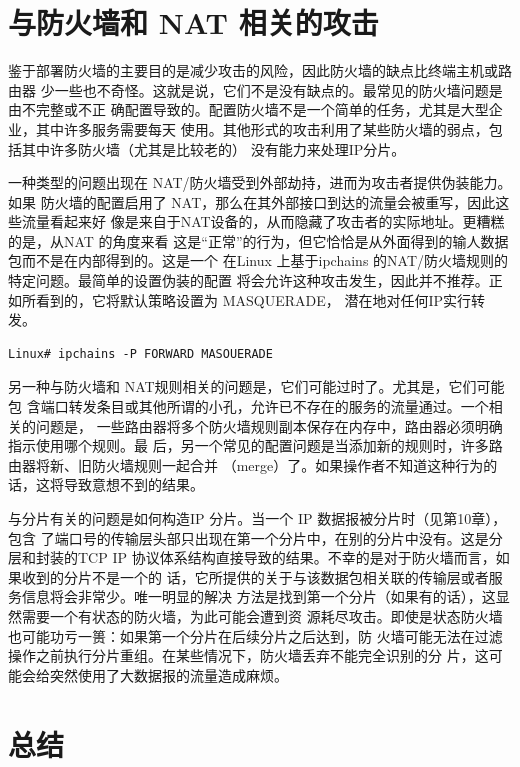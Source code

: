 \section{与防火墙和 NAT 相关的攻击}

鉴于部署防火墙的主要目的是减少攻击的风险，因此防火墙的缺点比终端主机或路由器
少一些也不奇怪。这就是说，它们不是没有缺点的。最常见的防火墙问题是由不完整或不正
确配置导致的。配置防火墙不是一个简单的任务，尤其是大型企业，其中许多服务需要每天
使用。其他形式的攻击利用了某些防火墙的弱点，包括其中许多防火墙（尤其是比较老的）
没有能力来处理IP分片。

一种类型的问题出现在 NAT/防火墙受到外部劫持，进而为攻击者提供伪装能力。如果
防火墙的配置启用了 NAT，那么在其外部接口到达的流量会被重写，因此这些流量看起来好
像是来自于NAT设备的，从而隐藏了攻击者的实际地址。更糟糕的是，从NAT 的角度来看
这是“正常”的行为，但它恰恰是从外面得到的输人数据包而不是在内部得到的。这是一个
在Linux 上基于ipchains 的NAT/防火墙规则的特定问题。最简单的设置伪装的配置
将会允许这种攻击发生，因此并不推荐。正如所看到的，它将默认策略设置为 MASQUERADE，
潜在地对任何IP实行转发。

\begin{verbatim}    
Linux# ipchains -P FORWARD MASOUERADE
\end{verbatim}


另一种与防火墙和 NAT规则相关的问题是，它们可能过时了。尤其是，它们可能包
含端口转发条目或其他所谓的小孔，允许已不存在的服务的流量通过。一个相关的问题是，
一些路由器将多个防火墙规则副本保存在内存中，路由器必须明确指示使用哪个规则。最
后，另一个常见的配置问题是当添加新的规则时，许多路由器将新、旧防火墙规则一起合并
（merge）了。如果操作者不知道这种行为的话，这将导致意想不到的结果。

与分片有关的问题是如何构造IP 分片。当一个 IP 数据报被分片时（见第10章），包含
了端口号的传输层头部只出现在第一个分片中，在别的分片中没有。这是分层和封装的TCP
IP 协议体系结构直接导致的结果。不幸的是对于防火墙而言，如果收到的分片不是一个的
话，它所提供的关于与该数据包相关联的传输层或者服务信息将会非常少。唯一明显的解决
方法是找到第一个分片（如果有的话），这显然需要一个有状态的防火墙，为此可能会遭到资
源耗尽攻击。即使是状态防火墙也可能功亏一篑：如果第一个分片在后续分片之后达到，防
火墙可能无法在过滤操作之前执行分片重组。在某些情况下，防火墙丢弃不能完全识别的分
片，这可能会给突然使用了大数据报的流量造成麻烦。

\section{总结}

